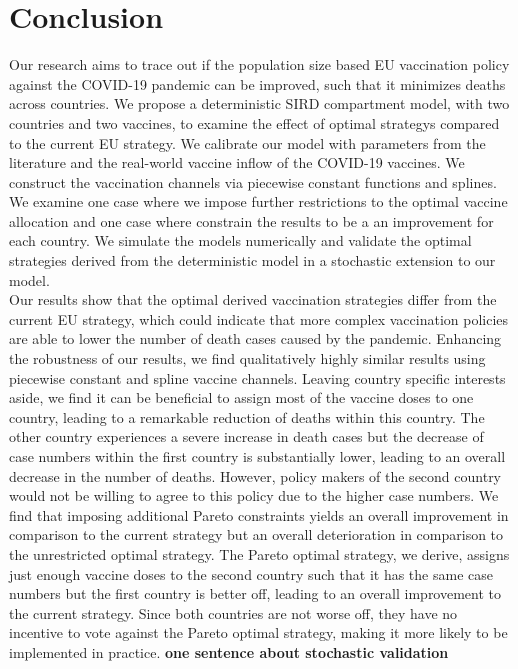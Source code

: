 \section{Conclusion}
Our research aims to trace out if the population size based EU vaccination policy against the COVID-19 pandemic can be improved, such that it minimizes deaths across countries. We propose a deterministic SIRD compartment model, with two countries and two vaccines, to examine the effect of optimal strategys compared to the current EU strategy. We calibrate our model with parameters from the literature and the real-world vaccine inflow of the COVID-19 vaccines. We construct the vaccination channels via piecewise constant functions and splines. We examine one case where we impose further restrictions to the optimal vaccine allocation and one case where constrain the results to be a an improvement for each country. We simulate the models numerically and validate the optimal strategies derived from the deterministic model in a stochastic extension to our model.\\

Our results show that the optimal derived vaccination strategies differ from the current EU strategy, which could indicate that more complex vaccination policies are able to lower the number of death cases caused by the pandemic. Enhancing the robustness of our results, we find qualitatively highly similar results using piecewise constant and spline vaccine channels. Leaving country specific interests aside, we find it can be beneficial to assign most of the vaccine doses to one country, leading to a remarkable reduction of deaths within this country. The other country experiences a severe increase in death cases but the decrease of case numbers within the first country is substantially lower, leading to an overall decrease in the number of deaths. However, policy makers of the second country would not be willing to agree to this policy due to the higher case numbers.  We find that imposing additional Pareto constraints yields an overall improvement in comparison to the current strategy but an overall deterioration in comparison to the unrestricted optimal strategy. The Pareto optimal strategy, we derive, assigns just enough vaccine doses to the second country such that it has the same case numbers but the first country is better off, leading to an overall improvement to the current strategy. Since both countries are not worse off, they have no incentive to vote against the Pareto optimal strategy, making it more likely to be implemented in practice. \textbf{one sentence about stochastic validation}\\

